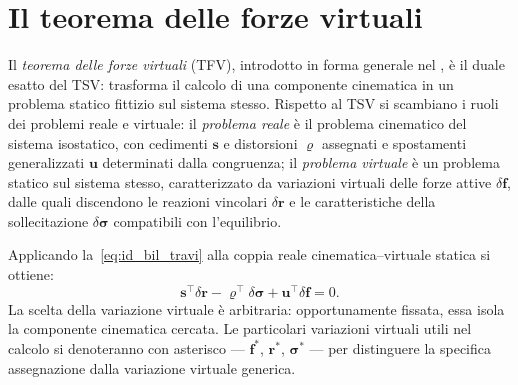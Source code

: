 \section{Il teorema delle forze virtuali}
\label{sec:TFV}

Il \emph{teorema delle forze virtuali} (TFV), introdotto
in forma generale nel , è il duale esatto
del TSV: trasforma il calcolo di una componente cinematica
in un problema statico fittizio sul sistema stesso.
Rispetto al TSV si scambiano i ruoli dei problemi reale e
virtuale: il \emph{problema reale} è il problema
cinematico del sistema isostatico, con cedimenti $\bm{s}$
e distorsioni $\bm{\varrho}$ assegnati e spostamenti
generalizzati $\bm{u}$ determinati dalla congruenza; il
\emph{problema virtuale} è un problema statico sul sistema
stesso, caratterizzato da variazioni virtuali delle forze
attive $\delta\bm{f}$, dalle quali discendono le reazioni
vincolari $\delta\bm{r}$ e le caratteristiche della
sollecitazione $\delta\bm{\sigma}$ compatibili con
l'equilibrio.

Applicando la~\eqref{eq:id_bil_travi} alla coppia reale
cinematica--virtuale statica si ottiene:
\begin{equation}\label{eq:TFV_generale}
	\bm{s}^\top\delta\bm{r} -
	\bm{\varrho}^\top\delta\bm{\sigma} +
	\bm{u}^\top\delta\bm{f} = 0.
\end{equation}
La scelta della variazione virtuale è arbitraria:
opportunamente fissata, essa isola la componente
cinematica cercata. Le particolari variazioni virtuali
utili nel calcolo si denoteranno con asterisco ---
$\bm{f}^*$, $\bm{r}^*$, $\bm{\sigma}^*$ --- per
distinguere la specifica assegnazione dalla variazione
virtuale generica.


